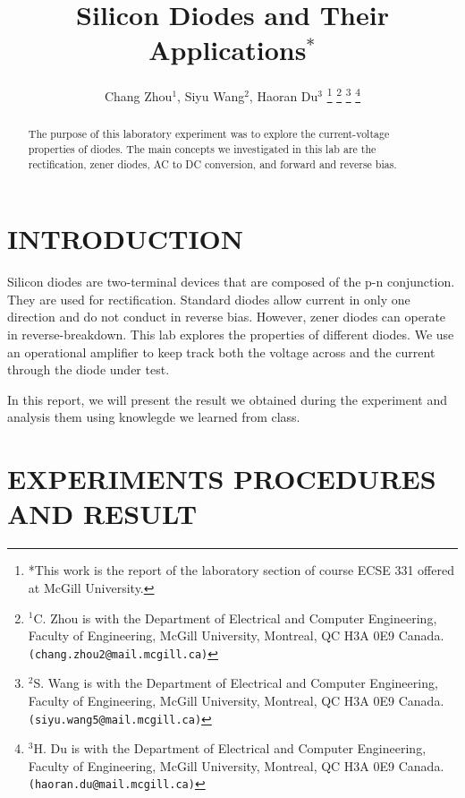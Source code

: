 \documentclass[letterpaper, 10 pt, conference]{ieeeconf}  %
\title{\LARGE \bf Silicon Diodes and Their Applications$^{*}$}
\author{Chang Zhou$^{1}$, Siyu Wang$^{2}$, Haoran Du$^{3}$%
\thanks{*This work is the report of the laboratory section of course ECSE 331 offered at McGill University.}%
\thanks{$^{1}$C. Zhou is with the Department of Electrical and Computer
Engineering, Faculty of Engineering, McGill University, Montreal, QC H3A 0E9 Canada.
{\tt\small (chang.zhou2@mail.mcgill.ca)}}%
\thanks{$^{2}$S. Wang is with the Department of Electrical and Computer
Engineering, Faculty of Engineering, McGill University, Montreal, QC H3A 0E9 Canada.
{\tt\small (siyu.wang5@mail.mcgill.ca)}}%
\thanks{$^{3}$H. Du is with the Department of Electrical and Computer
Engineering, Faculty of Engineering, McGill University, Montreal, QC H3A 0E9 Canada.
{\tt\small (haoran.du@mail.mcgill.ca)}}%
}
\begin{document}
\maketitle
\thispagestyle{empty}
\pagestyle{empty}


\begin{abstract}
  The purpose of this laboratory experiment was to explore the current-voltage properties of diodes. The main concepts we investigated in this lab are the rectification, zener diodes, AC to DC conversion, and forward and reverse bias.
\end{abstract}


\section{INTRODUCTION}
Silicon diodes are two-terminal devices that are composed of the p-n conjunction. They are used for rectification. Standard diodes allow current in only one direction and do not conduct in reverse bias. However, zener diodes can operate in reverse-breakdown. This lab explores the properties of different diodes. We use an operational amplifier to keep track both the voltage across and the current through the diode under test.
\par In this report, we will present the result we obtained during the experiment and analysis them using knowlegde we learned from class.
\section{EXPERIMENTS PROCEDURES AND RESULT}
\end{document}
